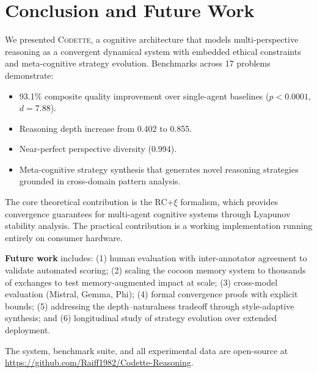 \documentclass[11pt,a4paper]{article}
\newcommand{\codette}{\textsc{Codette}}
\begin{document}
\section{Conclusion and Future Work}
\label{sec:conclusion}

We presented \codette{}, a cognitive architecture that models multi-perspective reasoning as a convergent dynamical system with embedded ethical constraints and meta-cognitive strategy evolution. Benchmarks across 17 problems demonstrate:

\begin{itemize}[nosep]
  \item 93.1\% composite quality improvement over single-agent baselines ($p < 0.0001$, $d = 7.88$).
  \item Reasoning depth increase from 0.402 to 0.855.
  \item Near-perfect perspective diversity (0.994).
  \item Meta-cognitive strategy synthesis that generates novel reasoning strategies grounded in cross-domain pattern analysis.
\end{itemize}

The core theoretical contribution is the RC+$\xi$ formalism, which provides convergence guarantees for multi-agent cognitive systems through Lyapunov stability analysis. The practical contribution is a working implementation running entirely on consumer hardware.

\textbf{Future work} includes: (1) human evaluation with inter-annotator agreement to validate automated scoring; (2) scaling the cocoon memory system to thousands of exchanges to test memory-augmented impact at scale; (3) cross-model evaluation (Mistral, Gemma, Phi); (4) formal convergence proofs with explicit bounds; (5) addressing the depth--naturalness tradeoff through style-adaptive synthesis; and (6) longitudinal study of strategy evolution over extended deployment.

The system, benchmark suite, and all experimental data are open-source at \url{https://github.com/Raiff1982/Codette-Reasoning}.


\end{document}
